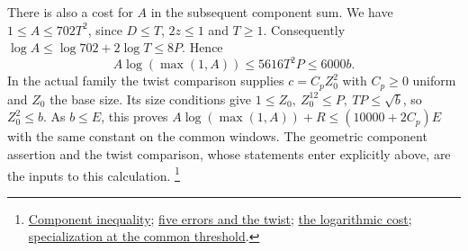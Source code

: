 There is also a cost for \(A\) in the subsequent component sum.
We have \(1\le A\le702T^2\), since \(D\le T\), \(2z\le1\) and \(T\ge1\).
Consequently \(\log A\le\log702+2\log T\le 8P\). Hence
\[
 A\log(\max(1,A))\le5616T^2P\le6000b .
\]
In the actual family the twist comparison supplies \(c=C_p Z_0^2\)
with \(C_p\ge0\) uniform and \(Z_0\) the base size. Its size conditions
give \(1\le Z_0,\ Z_0^{12}\le P,\ TP\le\sqrt b\), so \(Z_0^2\le b\).
As \(b\le E\), this proves
\(A\log(\max(1,A))+R\le(10000+2C_p)E\) with the same constant on the
common windows. The geometric component assertion and the twist
comparison, whose statements enter explicitly above, are the inputs
to this calculation.
\footnote{\href{https://github.com/Deicyde/riemann-hypothesis/blob/40e56bab/src/Formalism/LocalToGlobal/IndefiniteForms/IndefiniteTree/RealCubicMeans/LogMeanShares/LogMeanStatements/HSClaim.lean}{Component inequality};
\href{https://github.com/Deicyde/riemann-hypothesis/blob/40e56bab/src/Development/AbelianVarietyTheory/Proofs/DivisorProofs/DegBoundOfClaimNumbers.lean}{five errors and the twist};
\href{https://github.com/Deicyde/riemann-hypothesis/blob/40e56bab/src/Development/AbelianVarietyTheory/Proofs/DivisorProofs/HilbertSamuelALogALe.lean}{the logarithmic cost};
\href{https://github.com/Deicyde/riemann-hypothesis/blob/40e56bab/src/Development/AutomorphicArithmetic/ThetaCorrespondence/ThetaPairLifts/ThirdPlaceSeries/HilbertSamuelLowerBoundOfComponents.lean}{specialization at the common threshold}.}
